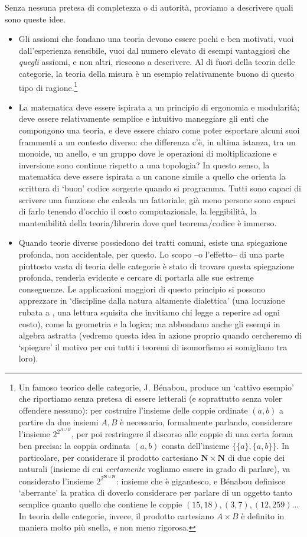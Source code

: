 \medskip
Senza nessuna pretesa di completezza o di autorità, proviamo a descrivere quali sono queste idee.
\begin{itemize}
	\item Gli assiomi che fondano una teoria devono essere pochi e ben motivati, vuoi dall'esperienza sensibile, vuoi dal numero elevato di esempi vantaggiosi che \emph{quegli} assiomi, e non altri, riescono a descrivere. Al di fuori della teoria delle categorie, la teoria della misura è un esempio relativamente buono di questo tipo di ragione.\footnote{Un famoso teorico delle categorie, J. Bénabou, produce un `cattivo esempio' che riportiamo senza pretesa di essere letterali (e soprattutto senza voler offendere nessuno): per costruire l'insieme delle coppie ordinate \((a,b)\) a partire da due insiemi \(A,B\) è necessario, formalmente parlando, considerare l'insieme \(2^{2^{A\cup B}}\), per poi restringere il discorso alle coppie di una certa forma ben precisa: la coppia ordinata \((a,b)\) consta dell'insieme \(\{\{a\},\{a,b\}\}\). In particolare, per considerare il prodotto cartesiano \(\mathbf{N} \times \mathbf{N}\) di due copie dei naturali (insieme di cui \emph{certamente} vogliamo essere in grado di parlare), va considerato l'insieme \(2^{2^{\mathbf{N} \cup \mathbf{N}}}\): insieme che è gigantesco, e Bénabou definisce `aberrante' la pratica di doverlo considerare per parlare di un oggetto tanto semplice quanto quello che contiene le coppie \((15,18), (3,7), (12, 259)\dots\) In teoria delle categorie, invece, il prodotto cartesiano \(A\times B\) è definito in maniera molto più snella, e non meno rigorosa.}
	\item La matematica deve essere ispirata a un principio di ergonomia e modularità; deve essere relativamente semplice e intuitivo maneggiare gli enti che compongono una teoria, e deve essere chiaro come poter esportare alcuni suoi frammenti a un contesto diverso: che differenza c'è, in ultima istanza, tra un monoide, un anello, e un gruppo dove le operazioni di moltiplicazione e inversione sono continue rispetto a una topologia? In questo senso, la matematica deve essere ispirata a un canone simile a quello che orienta la scrittura di `buon' codice sorgente quando si programma. Tutti sono capaci di scrivere una funzione che calcola un fattoriale; già meno persone sono capaci di farlo tenendo d'occhio il costo computazionale, la leggibilità, la mantenibilità della teoria/libreria dove quel teorema/codice è immerso.
	\item Quando teorie diverse possiedono dei tratti comuni, esiste una spiegazione profonda, non accidentale, per questo. Lo scopo --o l'effetto-- di una parte piuttosto vasta di teoria delle categorie è stato di trovare questa spiegazione profonda, renderla evidente e cercare di portarla alle sue estreme conseguenze. Le applicazioni maggiori di questo principio si possono apprezzare in `discipline dalla natura altamente dialettica' (una locuzione rubata a \cite{lawvere1999profilo}, una lettura squisita che invitiamo chi legge a reperire ad ogni costo), come la geometria e la logica; ma abbondano anche gli esempi in algebra astratta (vedremo questa idea in azione proprio quando cercheremo di `spiegare' il motivo per cui tutti i teoremi di isomorfismo si somigliano tra loro).

\end{itemize}
